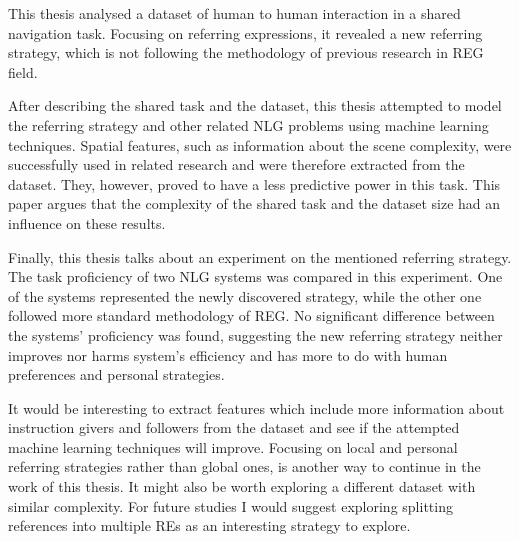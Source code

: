 This thesis analysed a dataset of human to human interaction in a shared navigation task. Focusing on referring expressions, it revealed a new referring strategy, which is not following the methodology of previous research in REG field. 

After describing the shared task and the dataset, this thesis attempted to model the referring strategy and other related NLG problems using machine learning techniques. Spatial features, such as information about the scene complexity, were successfully used in related research and were therefore extracted from the dataset. They, however, proved to have a less predictive power in this task. This paper argues that the complexity of the shared task and the dataset size had an influence on these results.

Finally, this thesis talks about an experiment on the mentioned referring strategy. The task proficiency of two NLG systems was compared in this experiment. One of the systems represented the newly discovered strategy, while the other one followed more standard methodology of REG. No significant difference between the systems' proficiency was found, suggesting the new referring strategy neither improves nor harms system's efficiency and has more to do with human preferences and personal strategies.

It would be interesting to extract features which include more information about instruction givers and followers from the dataset and see if the attempted machine learning techniques will improve. Focusing on local and personal referring strategies rather than global ones, is another way to continue in the work of this thesis. It might also be worth exploring a different dataset with similar complexity. For future studies I would suggest exploring splitting references into multiple REs as an interesting strategy to explore.


